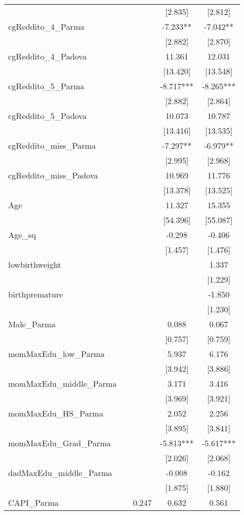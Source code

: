\documentclass[]{article}
\begin{document}
\begin{tabular}{lcccc}
 &  &  & [2.835] & [2.812] \\
cgReddito\_4\_Parma &  &  & -7.233** & -7.042** \\
 &  &  & [2.882] & [2.870] \\
cgReddito\_4\_Padova &  &  & 11.361 & 12.031 \\
 &  &  & [13.420] & [13.548] \\
cgReddito\_5\_Parma &  &  & -8.717*** & -8.265*** \\
 &  &  & [2.882] & [2.864] \\
cgReddito\_5\_Padova &  &  & 10.073 & 10.787 \\
 &  &  & [13.416] & [13.535] \\
cgReddito\_miss\_Parma &  &  & -7.297** & -6.979** \\
 &  &  & [2.995] & [2.968] \\
cgReddito\_miss\_Padova &  &  & 10.969 & 11.776 \\
 &  &  & [13.378] & [13.525] \\
Age &  &  & 11.327 & 15.355 \\
 &  &  & [54.396] & [55.087] \\
Age\_sq &  &  & -0.298 & -0.406 \\
 &  &  & [1.457] & [1.476] \\
lowbirthweight &  &  &  & 1.337 \\
 &  &  &  & [1.229] \\
birthpremature &  &  &  & -1.850 \\
 &  &  &  & [1.230] \\
Male\_Parma &  &  & 0.088 & 0.067 \\
 &  &  & [0.757] & [0.759] \\
momMaxEdu\_low\_Parma &  &  & 5.937 & 6.176 \\
 &  &  & [3.942] & [3.886] \\
momMaxEdu\_middle\_Parma &  &  & 3.171 & 3.416 \\
 &  &  & [3.969] & [3.921] \\
momMaxEdu\_HS\_Parma &  &  & 2.052 & 2.256 \\
 &  &  & [3.895] & [3.841] \\
momMaxEdu\_Grad\_Parma &  &  & -5.813*** & -5.617*** \\
 &  &  & [2.026] & [2.068] \\
dadMaxEdu\_middle\_Parma &  &  & -0.008 & -0.162 \\
 &  &  & [1.875] & [1.880] \\
CAPI\_Parma &  & 0.247 & 0.632 & 0.561 \\

\end{tabular}
\end{document}
